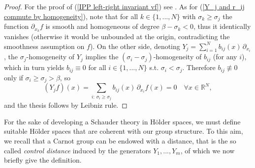 \documentclass{article}
\numberwithin{equation}{section}
\begin{document}
\vspace{2mm}


\begin{proof}
    For the proof of (\ref{IPP left-right invariant vf}) see \cite[Proposition 3.47]{librone}. As for (\ref{Y_j and r_ij commute by homogeneity}), note that for all $k \in \{1,...,N\}$ with $\sigma_k \geq \sigma_j$ the function $\partial_{x_k} f$ is smooth and homogeneous of degree $\beta-\sigma_k<0$, thus it identically vanishes (otherwise it would be unbounded at the origin, contradicting the smoothness assumption on $f$). On the other side, denoting $Y_j=\sum_{i=1}^N b_{ij}(x) \, \partial_{x_i}$, the $\sigma_j$-homogeneity of $Y_j$ implies the $(\sigma_i-\sigma_j)$-homogeneity of $b_{ij}$ (for any $i$), which in turn yields $b_{ij} \equiv 0$ for all $i \in \{1,...,N\}$ s.t. $\sigma_i<\sigma_j$. Therefore $b_{ij} \not\equiv 0$ only if $\sigma_i \geq \sigma_j>\beta$, so
    \begin{equation*}
        (Y_j f)(x) = \sum_{i:\, \sigma_i \geq \sigma_j} b_{ij}(x) \, \partial_{x_i}f(x)=0 \quad \forall x \in \mathbb{R}^N,
    \end{equation*}
    and the thesis follows by Leibniz rule.
\end{proof}

\vspace{2mm}

For the sake of developing a Schauder theory in Hölder spaces, we must define suitable Hölder spaces that are coherent with our group structure. To this aim, we recall that a Carnot group can be  endowed with a distance, that is the so called \emph{control distance} induced by the generators $Y_1,...,Y_m$, of which we now briefly give the definition. 
\end{document}
